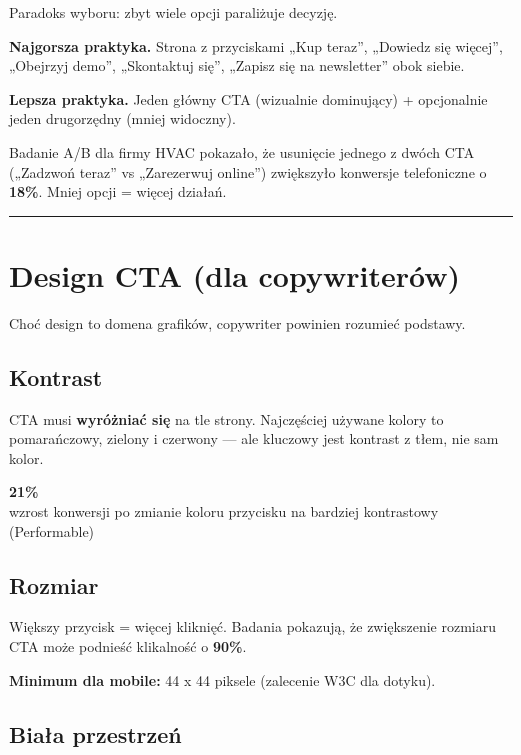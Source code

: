 \documentclass[
  12pt,
  a4paper,
  twoside,
  openright,
  12pt,
  DIV=12,
  BCOR=12mm]{scrbook}
\newcommand{\decoline}{%
  \begin{center}
    \textcolor{bordergray}{\rule{0.3\textwidth}{0.5pt}}
  \end{center}
}
\newcommand{\stathighlight}[2]{%
  \begin{center}
    \begin{tcolorbox}[
      enhanced,
      colback=primarylight,
      colframe=primaryblue,
      boxrule=1pt,
      arc=5pt,
      width=0.6\textwidth,
      halign=center
    ]
      {\fontsize{36}{40}\selectfont\bfseries\color{primarydark}#1}\\[5pt]
      {\color{textmuted}#2}
    \end{tcolorbox}
  \end{center}
}
\begin{document}
Paradoks wyboru: zbyt wiele opcji paraliżuje decyzję.

\textbf{Najgorsza praktyka.} Strona z przyciskami „Kup teraz'', „Dowiedz
się więcej'', „Obejrzyj demo'', „Skontaktuj się'', „Zapisz się na
newsletter'' obok siebie.

\textbf{Lepsza praktyka.} Jeden główny CTA (wizualnie dominujący) +
opcjonalnie jeden drugorzędny (mniej widoczny).

\begin{wazne}
Badanie A/B dla firmy HVAC pokazało, że usunięcie jednego z dwóch CTA („Zadzwoń teraz” vs „Zarezerwuj online”) zwiększyło konwersje telefoniczne o \textbf{18\%}. Mniej opcji = więcej działań.
\end{wazne}

\decoline

\section{Design CTA (dla
copywriterów)}\label{design-cta-dla-copywriteruxf3w}

Choć design to domena grafików, copywriter powinien rozumieć podstawy.

\subsection{Kontrast}\label{kontrast}

CTA musi \textbf{wyróżniać się} na tle strony. Najczęściej używane
kolory to pomarańczowy, zielony i czerwony --- ale kluczowy jest
kontrast z tłem, nie sam kolor.

\stathighlight{21\%}{wzrost konwersji po zmianie koloru przycisku na bardziej kontrastowy (Performable)}

\subsection{Rozmiar}\label{rozmiar}

Większy przycisk = więcej kliknięć. Badania pokazują, że zwiększenie
rozmiaru CTA może podnieść klikalność o \textbf{90\%}.

\textbf{Minimum dla mobile:} 44 x 44 piksele (zalecenie W3C dla dotyku).

\subsection{Biała przestrzeń}\label{biaux142a-przestrzeux144}
\end{document}
